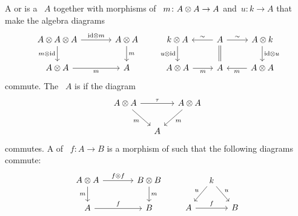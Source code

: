 \documentclass[a4paper,10pt,headings=standardclasses]{scrartcl}
\begin{document}
\begin{definition}
  A  or  is a {\dgv}~$A$ together with morphisms of {\dgvs}~$m \colon A \otimes A \to A$ and~$u \colon k \to A$ that make the algebra diagrams
  \[
    \begin{tikzcd}[column sep = large]
      A \tensor A \tensor A
      \arrow{r}[above]{{\id} \tensor m}
      \arrow{d}[left]{m \tensor {\id}}
      &
      A \tensor A
      \arrow{d}[right]{m}
      \\
      A \tensor A
      \arrow{r}[below]{m}
      &
      A
    \end{tikzcd}
    \qquad
    \begin{tikzcd}
      k \tensor A
      \arrow{d}[left]{u \tensor {\id}}
      &
      A
      \arrow{l}[above]{\sim}
      \arrow[equal]{d}
      \arrow{r}[above]{\sim}
      &
      A \tensor k
      \arrow{d}[right]{{\id} \tensor u}
      \\
      A \tensor A
      \arrow{r}[below]{m}
      &
      A
      &
      A \tensor A
      \arrow{l}[below]{m}
    \end{tikzcd}
  \]
  commute.
  The {\dga}~$A$ is  if the diagram
  \[
    \begin{tikzcd}[column sep = small]
      A \tensor A
      \arrow{rr}[above]{\tau}
      \arrow{dr}[below left]{m}
      &
      {}
      &
      A \tensor A
      \arrow{dl}[below right]{m}
      \\
      {}
      &
      A
      &
      {}
    \end{tikzcd}
  \]
  commutes.
  A  of {\dgas}~$f \colon A \to B$ is a morphism of {\dgvs} such that the following diagrams commute:
  \[
    \begin{tikzcd}[column sep = large]
      A \tensor A
      \arrow{r}[above]{f \tensor f}
      \arrow{d}[left]{m}
      &
      B \tensor B
      \arrow{d}[right]{m}
      \\
      A
      \arrow{r}[above]{f}
      &
      B
    \end{tikzcd}
    \qquad
    \begin{tikzcd}[column sep = small]
      {}
      &
      k
      \arrow{dl}[above left]{u}
      \arrow{dr}[above right]{u}
      &
      {}
      \\
      A
      \arrow{rr}[above]{f}
      &
      {}
      &
      B
    \end{tikzcd}
  \]
\end{definition}
\end{document}

